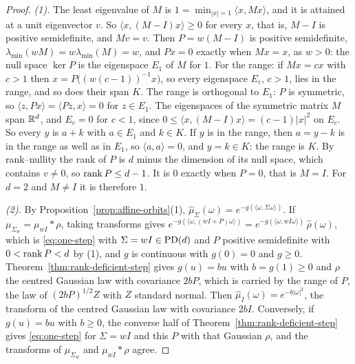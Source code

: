 \begin{proof}
\emph{(1).} The least eigenvalue of $M$ is $1 = \min_{|x| = 1}\langle x, Mx\rangle$, and it is attained at a unit eigenvector $v$. So $\langle x, (M - I)x\rangle \ge 0$ for
every $x$, that is, $M - I$ is positive semidefinite, and $Mv = v$. Then $P = w(M - I)$ is positive
semidefinite, $\lambda_{\min}(wM) = w\lambda_{\min}(M) = w$, and $Px = 0$ exactly when $Mx = x$, as
$w > 0$: the null space $\ker P$ is the eigenspace $E_1$ of $M$ for $1$. For the range: if $Mx = cx$ with
$c > 1$ then $x = P\bigl((w(c-1))^{-1}x\bigr)$, so every eigenspace $E_c$, $c > 1$, lies in the range,
and so does their span $K$. The range is orthogonal to $E_1$: $P$ is symmetric, so
$\langle z, Px\rangle = \langle Pz, x\rangle = 0$ for $z \in E_1$. The eigenspaces of
the symmetric matrix $M$ span $\mathbb{R}^d$, and $E_c = 0$ for $c < 1$, since
$0 \le \langle x, (M - I)x\rangle = (c - 1)|x|^2$ on $E_c$. So every $y$ is $a + k$ with $a \in E_1$ and
$k \in K$. If $y$ is in the range, then $a = y - k$ is in the range as well as in $E_1$, so
$\langle a, a\rangle = 0$, and $y = k \in K$: the range is $K$. By rank--nullity the rank of $P$ is $d$
minus the dimension of its null space, which contains $v \ne 0$, so $\operatorname{rank} P \le d - 1$. It is
$0$ exactly when $P = 0$, that is $M = I$. For $d = 2$ and $M \ne I$ it is therefore $1$.

\emph{(2).} By Proposition~\ref{prop:affine-orbits}(1), $\widehat\mu_\Sigma(\omega) = e^{-g(\langle\omega,\Sigma\omega\rangle)}$.
If $\mu_{\Sigma_w} = \mu_{wI} * \rho$, taking transforms gives
$e^{-g(\langle\omega,(wI + P)\omega\rangle)} = e^{-g(\langle\omega,wI\omega\rangle)}\,\widehat\rho(\omega)$, which is
\ref{eq:one-step} with $\Sigma = wI \in \mathrm{PD}(d)$ and $P$ positive semidefinite with $0 < \operatorname{rank} P < d$ by
(1), and $g$ is continuous with $g(0) = 0$ and $g \ge 0$. Theorem~\ref{thm:rank-deficient-step} gives $g(u) = bu$ with
$b = g(1) \ge 0$ and $\rho$ the centred Gaussian law with covariance $2bP$, which is carried by the range
of $P$, the law of $(2bP)^{1/2}Z$ with $Z$ standard normal. Then $\widehat\mu_I(\omega) = e^{-b|\omega|^2}$,
the transform of the centred Gaussian law with covariance $2bI$. Conversely, if $g(u) = bu$ with
$b \ge 0$, the converse half of Theorem~\ref{thm:rank-deficient-step} gives \ref{eq:one-step} for $\Sigma = wI$ and
this $P$ with that Gaussian $\rho$, and the transforms of $\mu_{\Sigma_w}$ and $\mu_{wI} * \rho$ agree.


\end{proof}
